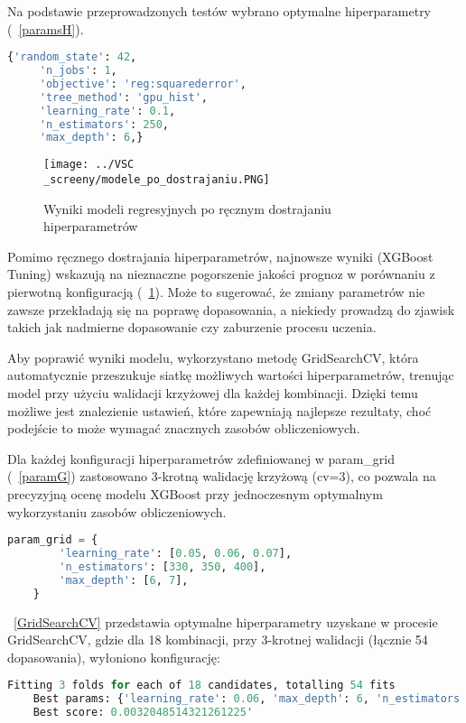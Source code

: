 \documentclass[12pt,a4paper]{report}
\theoremstyle{definition} %
\begin{document}
	Na podstawie przeprowadzonych testów wybrano optymalne hiperparametry (\lstlistingname~\ref{paramsH}).
	
	\begin{lstlisting}[language=Python,caption=Słownik standard\_params po dostrajaniu hiperparametrów,label=paramsH]
	{'random_state': 42,
	 'n_jobs': 1,
	 'objective': 'reg:squarederror',
	 'tree_method': 'gpu_hist',
	 'learning_rate': 0.1,
	 'n_estimators': 250,
	 'max_depth': 6,}
	\end{lstlisting}
	
	\begin{figure}[H]
	    \centering
	    \texttt{[image: ../VSC\\\_screeny/modele\_po\_dostrajaniu.PNG]} 
	    \caption{Wyniki modeli regresyjnych po ręcznym dostrajaniu hiperparametrów}
	    \label{fig:wynikiReczneDostrajanie}
	\end{figure}

	Pomimo ręcznego dostrajania hiperparametrów, najnowsze wyniki (XGBoost Tuning) wskazują na nieznaczne pogorszenie jakości prognoz w porównaniu z pierwotną konfiguracją (\figurename~\ref{fig:wynikiReczneDostrajanie}). Może to sugerować, że zmiany parametrów nie zawsze przekładają się na poprawę dopasowania, a niekiedy prowadzą do zjawisk takich jak nadmierne dopasowanie czy zaburzenie procesu uczenia.

	Aby poprawić wyniki modelu, wykorzystano metodę GridSearchCV, która automatycznie przeszukuje siatkę możliwych wartości hiperparametrów, trenując model przy użyciu walidacji krzyżowej dla każdej kombinacji. Dzięki temu możliwe jest znalezienie ustawień, które zapewniają najlepsze rezultaty, choć podejście to może wymagać znacznych 				zasobów obliczeniowych.

	Dla każdej konfiguracji hiperparametrów zdefiniowanej w param\_grid (\lstlistingname~\ref{paramG}) zastosowano 3-krotną walidację krzyżową (cv=3), co pozwala na precyzyjną ocenę modelu XGBoost przy jednoczesnym optymalnym wykorzystaniu zasobów obliczeniowych.
	\begin{lstlisting}[language=Python,caption=Konfiguracja hiperparametrów param\_grid, label=paramG]
	param_grid = {
	    'learning_rate': [0.05, 0.06, 0.07],
	    'n_estimators': [330, 350, 400],
	    'max_depth': [6, 7],
	}
	\end{lstlisting}

	\lstlistingname~\ref{GridSearchCV} przedstawia optymalne hiperparametry uzyskane w procesie GridSearchCV, gdzie dla 18 kombinacji, przy 3-krotnej walidacji (łącznie 54 dopasowania), wyłoniono konfigurację:
	\begin{lstlisting}[language=Python,caption=Wyniki dostrajania hiperparametrów przy użyciu GridSearchCV, label=GridSearchCV]
	Fitting 3 folds for each of 18 candidates, totalling 54 fits
	Best params: {'learning_rate': 0.06, 'max_depth': 6, 'n_estimators': 330}
	Best score: 0.0032048514321261225'
	\end{lstlisting}
\end{document}
